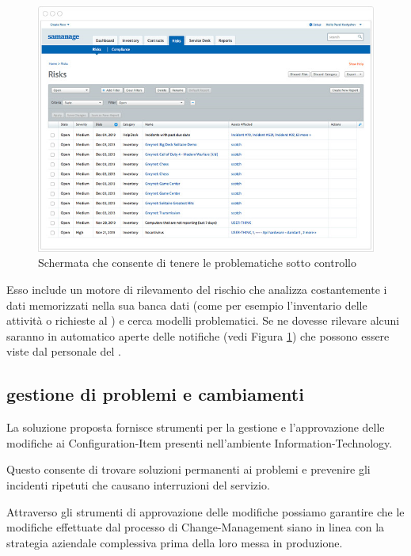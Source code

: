 \begin{figure}[htbp]
\centering
\includegraphics[scale=0.6]{Images/samanage/Risk_management.png}
\caption{Schermata che consente di tenere le problematiche sotto controllo}
\label{sd-tools-risk-img}
\end{figure}

Esso include un motore di rilevamento del rischio che analizza costantemente i dati memorizzati nella sua banca dati (come per esempio l'inventario delle attività o richieste al ) e cerca modelli problematici. Se ne dovesse rilevare alcuni saranno in automatico aperte delle notifiche (vedi Figura \ref{sd-tools-risk-img}) che possono essere viste dal personale del .

\subsection[Gestione di problemi e cambiamenti]{gestione di problemi e cambiamenti}
\label{sd-tools-pm}
La soluzione  proposta fornisce strumenti per la gestione e l'approvazione delle modifiche ai \ac{Configuration-Item} presenti nell'ambiente \acs{Information-Technology}.

Questo consente di trovare soluzioni permanenti ai problemi e prevenire gli incidenti ripetuti che causano interruzioni del servizio.

Attraverso gli strumenti di approvazione delle modifiche possiamo garantire che le modifiche effettuate dal processo di \ac{Change-Management} siano in linea con la strategia aziendale complessiva prima della loro messa in produzione.

